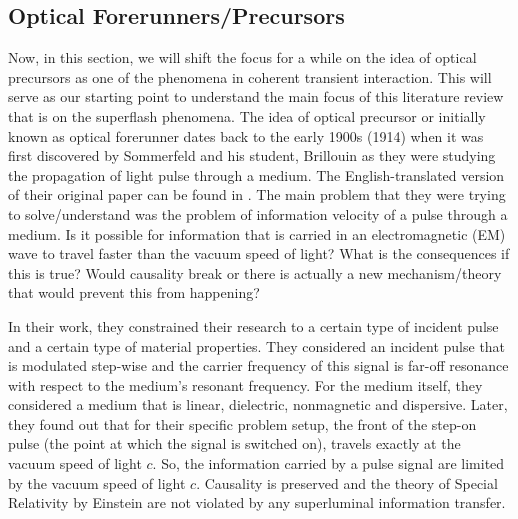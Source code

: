 \subsection{Optical Forerunners/Precursors}\label{precursor}
Now, in this section, we will shift the focus for a while on the idea of optical precursors as one of the phenomena in coherent transient interaction. This will serve as our starting point to understand the main focus of this literature review that is on the superflash phenomena. The idea of optical precursor or initially known as optical forerunner dates back to the early 1900s (1914) when it was first discovered by Sommerfeld and his student, Brillouin as they were studying the propagation of light pulse through a medium. The English-translated version of their original paper can be found in \cite{brillouin1969wave}. The main problem that they were trying to solve/understand was the problem of information velocity of a pulse through a medium. Is it possible for information that is carried in an electromagnetic (EM) wave to travel faster than the vacuum speed of light? What is the consequences if this is true? Would causality break or there is actually a new mechanism/theory that would prevent this from happening?

In their work, they constrained their research to a certain type of incident pulse and a certain type of material properties. They considered an incident pulse that is modulated step-wise and the carrier frequency of this signal is far-off resonance with respect to the medium's resonant frequency. For the medium itself, they considered a medium that is linear, dielectric, nonmagnetic and dispersive. Later, they found out that for their specific problem setup, the front of the step-on pulse (the point at which the signal is switched on), travels exactly at the vacuum speed of light $c$. So, the information carried by a pulse signal are limited by the vacuum speed of light $c$. Causality is preserved and the theory of Special Relativity by Einstein are not violated by any superluminal information transfer.

